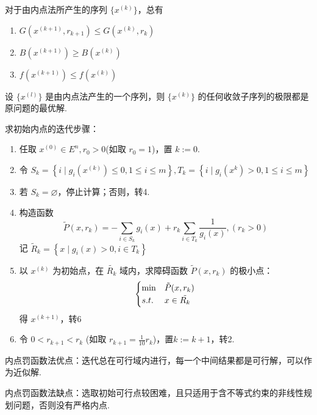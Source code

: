 \begin{theorem}
    对于由内点法所产生的序列 $\{x^{(k)}\}$，总有\begin{enumerate}
        \item $G(x^{(k + 1)}, r_{k + 1}) \le G(x^{(k)}, r_k)$
        \item $B(x^{(k + 1)}) \ge B(x^{(k)})$
        \item $f(x^{(k + 1)}) \le f(x^{(k)})$
    \end{enumerate}
\end{theorem}

\begin{theorem}
    设 $\{x^{(l)}\}$ 是由内点法产生的一个序列，则 $\{x^{(k)}\}$ 的任何收敛子序列的极限都是原问题的最优解.
\end{theorem}

\begin{note}
    求初始内点的迭代步骤：\begin{enumerate}
        \item 任取 $x^{(0)} \in E^n, r_0 > 0$(如取 $r_0 = 1$)，置 $k := 0$.
        \item 令 $S_k = \left\{i \mid g_i(x^{(k)}) \le 0, 1 \le i \le m\right\}, T_k = \left\{i \mid g_i(x^{k}) > 0, 1 \le i \le m\right\}$
        \item 若 $S_k = \varnothing$，停止计算；否则，转4.
        \item 构造函数 \[\widetilde{P}\left(x, r_{k}\right)=-\sum_{i \in S_{k}} g_{i}(x)+r_{k} \sum_{i \in T_{k}} \frac{1}{g_{i}(x)},\left(r_{k}>0\right)\]
        记 $\widetilde{R}_{k}=\left\{x \mid g_{i}(x)>0 ,i \in T_{k}\right\}$
        \item 以 $x^{(k)}$ 为初始点，在 $\tilde{R_k}$ 域内，求障碍函数 $\tilde{P}(x, r_k)$ 的极小点：\[\begin{cases}
            \min &\tilde{P}(x, r_k)\\
            s.t. & x \in \tilde{R_k}
        \end{cases}\] 得 $x^{(k + 1)}$，转6
        \item 令 $ 0 < r_{k + 1} < r_k$ (如取 $r_{k + 1} = \frac{1}{10}r_k$)，置$k:=k+1$，转2.
    \end{enumerate}
\end{note}

\begin{note}
    内点罚函数法优点：迭代总在可行域内进行，每一个中间结果都是可行解，可以作为近似解.

    内点罚函数法缺点：选取初始可行点较困难，且只适用于含不等式约束的非线性规划问题，否则没有严格内点.
\end{note}

